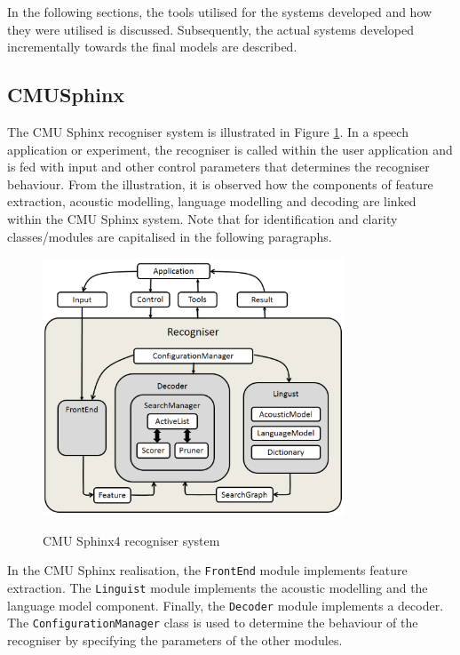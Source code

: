 In the following sections, the tools utilised for the systems developed and how they were utilised is discussed.  Subsequently, the actual systems developed incrementally towards the final models are described.

\subsection{CMUSphinx}
The CMU Sphinx recogniser system is illustrated in Figure \ref{fig_c3_sphinx}.  In a speech application or experiment, the recogniser is called within the user application and is fed with input and other control parameters that determines the recogniser behaviour.  From the illustration, it is observed how the components of feature extraction, acoustic modelling, language modelling and decoding are linked within the CMU Sphinx system.  Note that for identification and clarity classes/modules are capitalised in the following paragraphs.

\begin{figure}
\centering
  \includegraphics[width=9cm]{thesis/images/sphinx}\\
  \caption{CMU Sphinx4 recogniser system }\label{fig_c3_sphinx}
\end{figure}
In the CMU Sphinx realisation, the \texttt{FrontEnd} module implements feature extraction.  The \texttt{Linguist} module implements the acoustic modelling and the language model component. Finally, the \texttt{Decoder} module implements a decoder.  The \texttt{ConfigurationManager} class is used to determine the behaviour of the recogniser by specifying the parameters of the other modules.   

